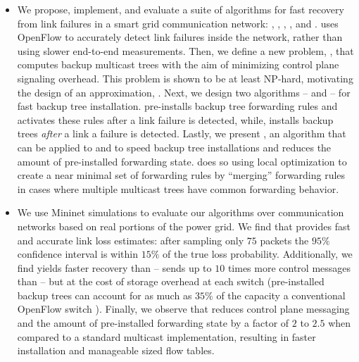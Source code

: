 \begin{itemize}
	\item We propose, implement, and evaluate a suite of algorithms for fast recovery from link failures in a smart grid communication network: \pcnts, \steiners, \pres, \posts, and \merges.
	\pcnt uses OpenFlow to accurately detect link failures inside the network, rather than using slower end-to-end measurements. Then, we define a new problem, \mcs, that computes backup 
	multicast trees with the aim of minimizing control plane signaling overhead. %
	This problem is shown to be at least NP-hard, motivating the design of an approximation, \steiners. 
	Next, we design two algorithms -- \pre and \post -- for fast backup tree installation. \pre pre-installs backup tree forwarding rules and
	activates these rules after a link failure is detected, while, \post installs backup trees \emph{after} a link a failure is detected. 
	Lastly, we present \merges, an algorithm that can be applied to \pre and \post to speed backup tree installations and reduces the amount of pre-installed forwarding state. 
	\merge does so using local optimization to create a near minimal set of forwarding rules by ``merging'' forwarding rules in cases where multiple multicast trees have common forwarding behavior.

	\item 
	We use Mininet \cite{Lantz10} simulations to evaluate our algorithms over communication networks based on real portions of the power grid.
	We find that \pcnt provides fast and accurate link loss estimates: after sampling only $75$ packets
	the $95\%$ confidence interval is within $15\%$ of the true loss probability.  
	Additionally, we find \pre yields faster recovery than \post -- 
	\post sends up to $10$ times more control messages than \pre -- but at the cost of storage overhead at each switch (pre-installed backup trees can account for as much
	as $35\%$ of the capacity a conventional OpenFlow switch \cite{Curtis11}).
	Finally, we observe that \merge reduces control plane messaging and the amount of pre-installed forwarding state by a factor of $2$ to $2.5$ when compared to a standard multicast
	implementation, resulting in faster installation and manageable sized flow tables.






		

\end{itemize}




